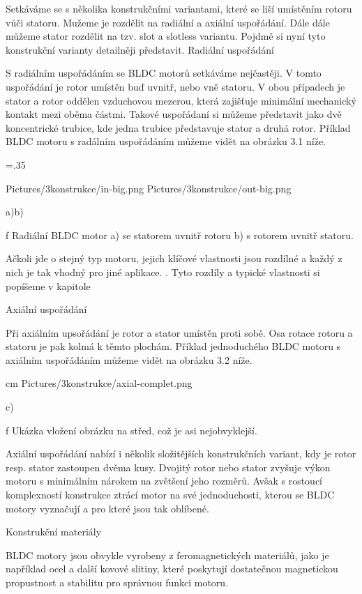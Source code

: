 Setkáváme se s několika konstrukčními variantami, které se liší umístěním rotoru vůči statoru. Mužeme je rozdělit na radiální a axiální uspořádání.
Dále dále můžeme stator rozdělit na tzv. slot a slotless variantu. Pojdmě si nyní tyto konstrukční varianty detailněji představit.   
\secc Radiální uspořádání

S radiálním uspořádáním se BLDC motorů setkáváme nejčastěji. V tomto uspořádání je rotor umístěn buď uvnitř, nebo vně statoru. 
V obou případech je stator a rotor oddělen vzduchovou mezerou, která zajišťuje minimální mechanický kontakt mezi oběma částmi. 
Takové uspořádaní si můžeme představit jako dvě koncentrické trubice, kde jedna trubice představuje stator a druhá rotor.
Příklad BLDC motoru s radálním uspořádáním můžeme vidět na obrázku 3.1 níže.

\medskip
\picw=.35\hsize
{} %
\centerline {\inspic Pictures/3konstrukce/in-big.png \hfil\hfil \inspic Pictures/3konstrukce/out-big.png }\nobreak
\centerline {a)\hfil\hfil b)}\nobreak\medskip
\caption/f Radiální BLDC motor a) se statorem uvnitř rotoru b) s rotorem uvnitř statoru.
 \medskip
 
Ačkoli jde o stejný typ motoru, jejich klíčové vlastnosti jsou rozdílné a každý z nich je tak vhodný pro jiné aplikace. 
. Tyto rozdíly a typické vlastnosti si popíšeme v kapitole %

\secc Axiální uspořádání

Při axiálním upsořádání je rotor a stator umístěn proti sobě. Osa rotace rotoru a statoru je pak kolmá k těmto plochám.
Příklad jednoduchého BLDC motoru s axiálním uspořádáním můžeme vidět na obrázku 3.2 níže. 

 \medskip
  cm \cinspic Pictures/3konstrukce/axial-complet.png 
 \centerline {c)}\nobreak\medskip
 \caption/f Ukázka vložení obrázku na střed, což je asi nejobvyklejší.
 \medskip
 
 Axiální uspořádání nabízí i několik složitějších konstrukčních variant, kdy je rotor resp. stator zastoupen dvěma kusy.
 Dvojitý rotor nebo stator zvyšuje výkon motoru s minimálním nárokem na zvětšení jeho rozměrů. Avšak s rostoucí komplexností konstrukce
 ztrácí motor na své jednoduchosti, kterou se BLDC motory vyznačují a pro které jsou tak oblíbené.     

\secc Konstrukční materiály

BLDC motory jsou obvykle vyrobeny z feromagnetických materiálů, jako je 
například ocel a další kovové slitiny, které poskytují dostatečnou magnetickou propustnost a stabilitu 
pro správnou funkci motoru.

